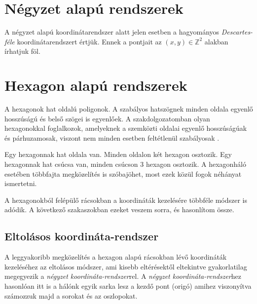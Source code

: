 
\section{Négyzet alapú rendszerek}

A négyzet alapú koordinátarendszer alatt jelen esetben a hagyományos \textit{Descartes-féle} koordinátarendszert értjük. Ennek a pontjait az $(x, y) \in \mathbb{Z}^2$ alakban írhatjuk föl.


\section{Hexagon alapú rendszerek}
\label{sec:hexagon}

A hexagonok hat oldalú poligonok. A szabályos hatszögnek minden oldala egyenlő hosszúságú és belső szögei is egyenlőek. A szakdolgozatomban olyan hexagonokkal foglalkozok, amelyeknek a szemközti oldalai egyenlő hosszúságúak és párhuzamosak, viszont nem minden esetben feltétlenül szabályosak \cite{HexWiki}.

Egy hexagonnak hat oldala van. Minden oldalon két hexagon osztozik. Egy hexagonnak hat csúcsa van, minden csúcson 3 hexagon osztozik. A hexagonháló esetében többfajta megközelítés is szóbajöhet, most ezek közül fogok néhányat ismertetni.

A hexagonokból felépülő rácsokban a koordináták kezelésére többféle módszer is adódik. A következő szakaszokban ezeket veszem sorra, és hasonlítom össze.

\subsection{Eltolásos koordináta-rendszer}

A leggyakoribb megközelítés a hexagon alapú rácsokban lévő koordináták kezeléséhez az eltolásos módszer, ami kisebb eltérésektől eltekintve gyakorlatilag megegyezik a \textit{négyzet koordináta-rendszer}rel. A \textit{négyzet koordináta-rendszer}hez hasonlóan itt is a hálónk egyik sarka lesz a kezdő pont (origó) amihez viszonyítva számozzuk majd a sorokat és az oszlopokat.

